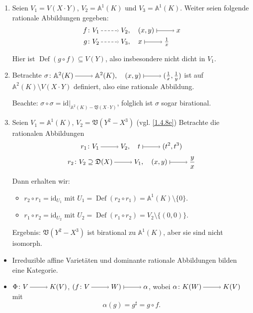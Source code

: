 \documentclass[a4paper,12pt]{scrbook}
\def\A{\mathbb{A}}
\def\V{\mathfrak{V}}
\newcommand{\D}{\mathfrak{D}}
\newcommand{\id}{\mathrm{id}}
\newcommand{\Def}{\operatorname{Def}}
\newcommand{\restrict}[1]{|_{#1}}
\newcommand{\ra}{\raisebox{-1pt}{\tikz{\draw[thin,shorten >=3pt, ->] (0,0) node{\hspace*{-2pt}} -- node{} (1,0);}}\penalty1000\relax}
\renewcommand{\mapsto}{\raisebox{-1pt}{\tikz{\draw[thin,shorten >=3pt, |->] (0,0) node{\hspace*{0pt}} -- node{} (1,0);}}\penalty1000\relax}
\newcommand{\ppf}{\raisebox{-1pt}{\tikz{\draw[densely dashed,thin,shorten >=3pt, ->] (0,0) node{\hspace*{-2pt}} -- node{} (1,0);}}\penalty1000\relax}
\begin{document}
\begin{bsp}\label{1.6.6}
  \begin{enumerate}
  \item{} Seien $V_1=V(X\cdot Y)$, $V_2=\A^1(K)$ und $V_3=\A^1(K)$. Weiter seien folgende rationale Abbildungen gegeben:
  \begin{align*}f\colon&V_1\ppf V_2, \quad (x,y)\mapsto x\\
  g\colon&V_2\ppf V_3, \quad x\mapsto \tfrac{1}{x}\end{align*}

  Hier ist $\Def(g\circ f)\subseteq V(Y)$, also insbesondere nicht dicht in $V_1$.
  \item{} Betrachte $\sigma \colon \A^2(K)\ra \A^2(K), \quad (x,y)\mapsto (\frac{1}{x},\frac{1}{y})$ ist auf $\A^2(K)\setminus V(X\cdot Y)$ definiert, also eine rationale Abbildung.

  Beachte: $\sigma\circ \sigma=\id{\restrict{\A^2(K)-\V(X\cdot Y)}}$, folglich ist $\sigma$ sogar birational.

  \item\label{1.6.6c} Seien $V_1=\A^1(K)$, $V_2=\V(Y^2-X^3)$ (vgl. \cref{1.4.8e}) Betrachte die rationalen Abbildungen 
  \[r_1 \colon V_1\ra V_2, \quad t\mapsto (t^2,t^3)\]
  \[r_2 \colon V_2\supseteq \D(X)\ra V_1, \quad (x,y)\mapsto \frac{y}{x}\]

  Dann erhalten wir:\begin{itemize}
     \item $r_2\circ r_1=\id_{U_1}$ mit $U_1=\Def(r_2\circ r_1)=\A^1(K)\setminus \{0\}$.
     \item $r_1\circ r_2=\id_{U_2}$ mit $U_2=\Def(r_1\circ r_2)=V_2\setminus \{(0,0)\}$.
     \end{itemize}
  Ergebnis: $\V(Y^2-X^3)$ ist birational zu $\A^1(K)$, aber sie sind nicht isomorph.
  \end{enumerate}
\end{bsp}  

\begin{nbem}
\begin{itemize}[leftmargin=*,labelindent=\parindent]
  \item Irreduzible affine Varietäten und dominante rationale Abbildungen bilden eine Kategorie.
  \item $\Phi \colon V\ra K(V)$, $(f\colon V\ra W)\mapsto \alpha$, wobei $\alpha\colon K(W)\ra K(V)$ mit \[\alpha(g)=g^{\sharp}=g\circ f.\]
\end{itemize}
\end{nbem}
 
\end{document}
